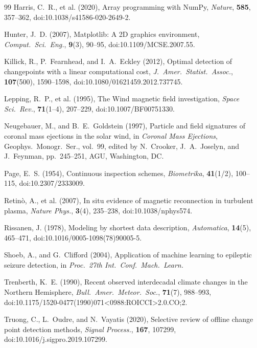 \documentclass[12pt,letterpaper]{article}
\begin{document}
\begin{thebibliography}{99}
Harris, C.~R., et al. (2020),
Array programming with NumPy,
\textit{Nature}, \textbf{585}, 357--362,
doi:10.1038/s41586-020-2649-2.

Hunter, J.~D. (2007),
Matplotlib: A 2D graphics environment,
\textit{Comput.\ Sci.\ Eng.}, \textbf{9}(3), 90--95,
doi:10.1109/MCSE.2007.55.

Killick, R., P.~Fearnhead, and I.~A.~Eckley (2012),
Optimal detection of changepoints with a linear computational cost,
\textit{J.\ Amer.\ Statist.\ Assoc.}, \textbf{107}(500), 1590--1598,
doi:10.1080/01621459.2012.737745.

Lepping, R.~P., et al. (1995),
The Wind magnetic field investigation,
\textit{Space Sci.\ Rev.}, \textbf{71}(1--4), 207--229,
doi:10.1007/BF00751330.

Neugebauer, M., and B.~E.~Goldstein (1997),
Particle and field signatures of coronal mass ejections in the solar wind,
in \textit{Coronal Mass Ejections}, Geophys.\ Monogr.\ Ser., vol.\ 99,
edited by N.~Crooker, J.~A.~Joselyn, and J.~Feynman, pp.\ 245--251,
AGU, Washington, DC.

Page, E.~S. (1954),
Continuous inspection schemes,
\textit{Biometrika}, \textbf{41}(1/2), 100--115,
doi:10.2307/2333009.

Retin\`o, A., et al. (2007),
In situ evidence of magnetic reconnection in turbulent plasma,
\textit{Nature Phys.}, \textbf{3}(4), 235--238,
doi:10.1038/nphys574.

Rissanen, J. (1978),
Modeling by shortest data description,
\textit{Automatica}, \textbf{14}(5), 465--471,
doi:10.1016/0005-1098(78)90005-5.

Shoeb, A., and G.~Clifford (2004),
Application of machine learning to epileptic seizure detection,
in \textit{Proc.\ 27th Int.\ Conf.\ Mach.\ Learn.}

Trenberth, K.~E. (1990),
Recent observed interdecadal climate changes in the Northern Hemisphere,
\textit{Bull.\ Amer.\ Meteor.\ Soc.}, \textbf{71}(7), 988--993,
doi:10.1175/1520-0477(1990)071<0988:ROICCI>2.0.CO;2.

Truong, C., L.~Oudre, and N.~Vayatis (2020),
Selective review of offline change point detection methods,
\textit{Signal Process.}, \textbf{167}, 107299,
doi:10.1016/j.sigpro.2019.107299.


\end{thebibliography}
\end{document}
